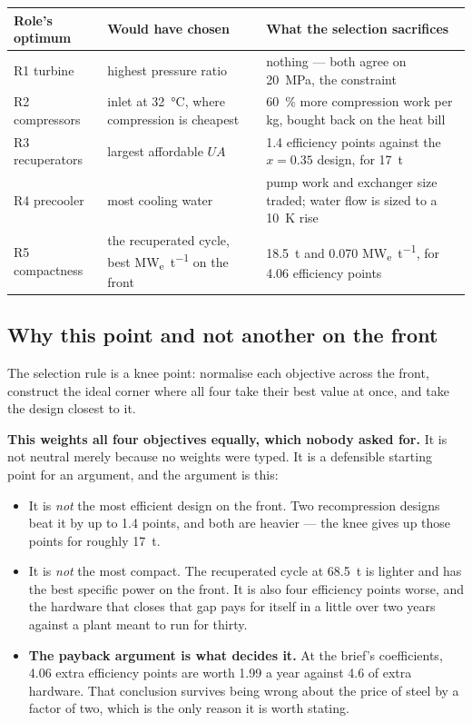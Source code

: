 \begin{center}
\small
\begin{tabular}{@{}p{3.4cm}p{4.4cm}p{6.2cm}@{}}
\toprule
Role's optimum & Would have chosen & What the selection sacrifices \\
\midrule
R1 turbine & highest pressure ratio & nothing --- both agree on
\SI{20}{\mega\pascal}, the constraint \\[2pt]
R2 compressors & inlet at \SI{32}{\celsius}, where compression is
cheapest & \SI{60}{\percent} more compression work per
\si{\kilo\gram}, bought back on the heat bill \\[2pt]
R3 recuperators & largest affordable $UA$ & \num{1.4} efficiency
points against the $x = 0.35$ design, for \SI{17}{\tonne} \\[2pt]
R4 precooler & most cooling water & pump work and exchanger size
traded; water flow is sized to a \SI{10}{\kelvin} rise \\[2pt]
R5 compactness & the recuperated cycle, best
\si{\mega\watt_e\per\tonne} on the front &
\SI{18.5}{\tonne} and \num{0.070}
\si{\mega\watt_e\per\tonne}, for \num{4.06} efficiency points \\
\bottomrule
\end{tabular}
\end{center}

\subsection{Why this point and not another on the front}

The selection rule is a knee point: normalise each objective across the
front, construct the ideal corner where all four take their best value
at once, and take the design closest to it.

\textbf{This weights all four objectives equally, which nobody asked
for.} It is not neutral merely because no weights were typed. It is a
defensible starting point for an argument, and the argument is this:

\begin{itemize}\itemsep3pt
\item It is \emph{not} the most efficient design on the front. Two
      recompression designs beat it by up to \num{1.4} points, and both
      are heavier --- the knee gives up those points for roughly
      \SI{17}{\tonne}.
\item It is \emph{not} the most compact. The recuperated cycle at
      \SI{68.5}{\tonne} is lighter and has the best specific power on
      the front. It is also four efficiency points worse, and the
      hardware that closes that gap pays for itself in a little over
      two years against a plant meant to run for thirty.
\item \textbf{The payback argument is what decides it.} At the brief's
      coefficients, \num{4.06} extra efficiency points are worth
      \SI{1.99}{} a year against
      \SI{4.6}{} of extra hardware. That conclusion
      survives being wrong about the price of steel by a factor of two,
      which is the only reason it is worth stating.
\end{itemize}

